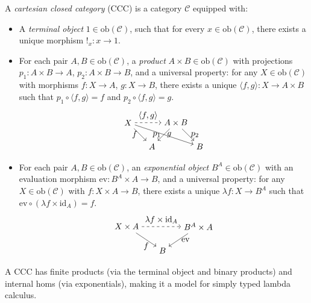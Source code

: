 \documentclass{article}
\begin{document}
\begin{definition}
A \emph{cartesian closed category} (CCC) is a category $\mathcal{C}$ equipped with:
\begin{itemize}
    \item A \emph{terminal object} $1 \in \mathrm{ob}(\mathcal{C})$, such that for every $x \in \mathrm{ob}(\mathcal{C})$, there exists a unique morphism $!_x : x \to 1$.
    \item For each pair $A, B \in \mathrm{ob}(\mathcal{C})$, a \emph{product} $A \times B \in \mathrm{ob}(\mathcal{C})$ with projections $p_1 : A \times B \to A$, $p_2 : A \times B \to B$, and a universal property: for any $X \in \mathrm{ob}(\mathcal{C})$ with morphisms $f : X \to A$, $g : X \to B$, there exists a unique $\langle f, g \rangle : X \to A \times B$ such that $p_1 \circ \langle f, g \rangle = f$ and $p_2 \circ \langle f, g \rangle = g$.
    \[
    \begin{tikzpicture}
        \node (X) at (0,1) {$X$};
        \node (AB) at (2,1) {$A \times B$};
        \node (A) at (1,0) {$A$};
        \node (B) at (3,0) {$B$};
        \draw[->, dashed] (X) to node[above] {$\langle f, g \rangle$} (AB);
        \draw[->] (X) to node[left] {$f$} (A);
        \draw[->] (X) to node[right] {$g$} (B);
        \draw[->] (AB) to node[left] {$p_1$} (A);
        \draw[->] (AB) to node[right] {$p_2$} (B);
    \end{tikzpicture}
    \]
    \item For each pair $A, B \in \mathrm{ob}(\mathcal{C})$, an \emph{exponential object} $B^A \in \mathrm{ob}(\mathcal{C})$ with an evaluation morphism $\mathrm{ev} : B^A \times A \to B$, and a universal property: for any $X \in \mathrm{ob}(\mathcal{C})$ with $f : X \times A \to B$, there exists a unique $\lambda f : X \to B^A$ such that $\mathrm{ev} \circ (\lambda f \times \mathrm{id}_A) = f$.
    \[
    \begin{tikzpicture}
        \node (XA) at (0,1) {$X \times A$};
        \node (BAxA) at (3,1) {$B^A \times A$};
        \node (B) at (1.5,0) {$B$};
        \draw[->, dashed] (XA) to node[above] {$\lambda f \times \mathrm{id}_A$} (BAxA);
        \draw[->] (XA) to node[below] {$f$} (B);
        \draw[->] (BAxA) to node[right] {$\mathrm{ev}$} (B);
    \end{tikzpicture}
    \]
\end{itemize}
\end{definition}

\begin{remark}
A CCC has finite products (via the terminal object and binary products) and internal homs (via exponentials), making it a model for simply typed lambda calculus.
\end{remark}
\end{document}
